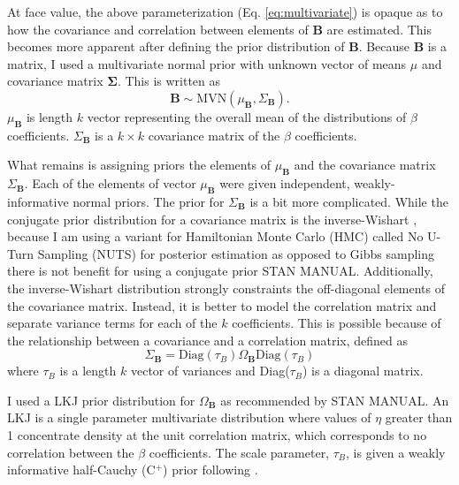 \documentclass[12pt,letterpaper]{article}
\begin{document}
At face value, the above parameterization (Eq. \ref{eq:multivariate}) is opaque as to how the covariance and correlation between elements of \(\mathbf{B}\) are estimated. This becomes more apparent after defining the prior distribution of \(\mathbf{B}\). Because \(\mathbf{B}\) is a matrix, I used a multivariate normal prior with unknown vector of means \(\mu\) and covariance matrix \(\mathbf{\Sigma}\). This is written as 
\begin{equation}
  \mathbf{B} \sim \mathrm{MVN}(\mu_{\mathbf{B}}, \Sigma_{\mathbf{B}}).
  \label{eq:beta_prior}
\end{equation}
\(\mu_{\mathbf{B}}\) is length \(k\) vector representing the overall mean of the distributions of \(\beta\) coefficients. \(\Sigma_{\mathbf{B}}\) is a \(k \times k\) covariance matrix of the \(\beta\) coefficients.

What remains is assigning priors the elements of \(\mu_{\mathbf{B}}\) and the covariance matrix \(\Sigma_{\mathbf{B}}\). Each of the elements of vector \(\mu_{\mathbf{B}}\) were given independent, weakly-informative normal priors. The prior for \(\Sigma_{\mathbf{B}}\) is a bit more complicated. While the conjugate prior distribution for a covariance matrix is the inverse-Wishart \citep{Gelman2013d}, because I am using a variant for Hamiltonian Monte Carlo (HMC) called No U-Turn Sampling (NUTS) for posterior estimation as opposed to Gibbs sampling there is not benefit for using a conjugate prior \uppercase{stan manual}. Additionally, the inverse-Wishart distribution strongly constraints the off-diagonal elements of the covariance matrix. Instead, it is better to model the correlation matrix and separate variance terms for each of the \(k\) coefficients. This is possible because of the relationship between a covariance and a correlation matrix, defined as 
\begin{equation}
  \Sigma_{\mathbf{B}} = \text{Diag}(\tau_{B}) \Omega_{\mathbf{B}} \text{Diag}(\tau_{B})
  \label{eq:covcor}
\end{equation}
where \(\tau_{B}\) is a length \(k\) vector of variances and Diag(\(\tau_{B}\)) is a diagonal matrix.

I used a LKJ prior distribution for \(\Omega_{\mathbf{B}}\) as recommended by \uppercase{stan manual}. An LKJ is a single parameter multivariate distribution where values of \(\eta\) greater than 1 concentrate density at the unit correlation matrix, which corresponds to no correlation between the \(\beta\) coefficients. The scale parameter, \(\tau_{B}\), is given a weakly informative half-Cauchy (C\(^{+}\)) prior following \citet{Gelman2006a}.
\end{document}
